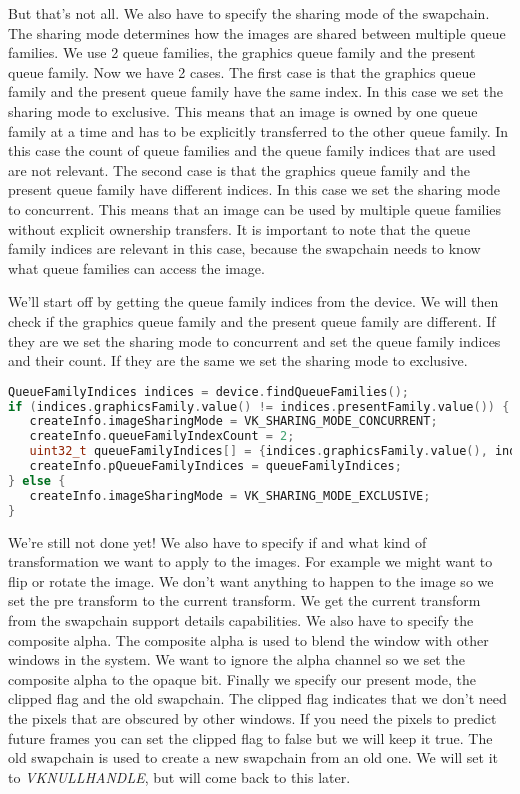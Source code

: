 \documentclass[12pt]{report} \usepackage{preamble}
\begin{document}
But that's not all. We also have to specify the sharing mode of the swapchain. The sharing mode
determines how the images are shared between multiple queue families. We use 2 queue families, the
graphics queue family and the present queue family. Now we have 2 cases. The first case is that the
graphics queue family and the present queue family have the same index. In this case we set the sharing
mode to exclusive. This means that an image is owned by one queue family at a time and has to be
explicitly transferred to the other queue family. In this case the count of queue families and the
queue family indices that are used are not relevant. The second case is that the graphics queue family
and the present queue family have different indices. In this case we set the sharing mode to concurrent.
This means that an image can be used by multiple queue families without explicit ownership transfers.
It is important to note that the queue family indices are relevant in this case, because the swapchain needs
to know what queue families can access the image.

We'll start off by getting the queue family indices from the device. We will then check if the graphics
queue family and the present queue family are different. If they are we set the sharing mode to concurrent
and set the queue family indices and their count. If they are the same we set the sharing mode to exclusive.

\begin{lstlisting}[language=C++]
QueueFamilyIndices indices = device.findQueueFamilies();
if (indices.graphicsFamily.value() != indices.presentFamily.value()) {
   createInfo.imageSharingMode = VK_SHARING_MODE_CONCURRENT;
   createInfo.queueFamilyIndexCount = 2;
   uint32_t queueFamilyIndices[] = {indices.graphicsFamily.value(), indices.presentFamily.value()};
   createInfo.pQueueFamilyIndices = queueFamilyIndices;
} else {
   createInfo.imageSharingMode = VK_SHARING_MODE_EXCLUSIVE;
}
\end{lstlisting}

We're still not done yet! We also have to specify if and what kind of transformation we want
to apply to the images. For example we might want to flip or rotate the image. We don't want
anything to happen to the image so we set the pre transform to the current transform. We get
the current transform from the swapchain support details capabilities. We also have to specify
the composite alpha. The composite alpha is used to blend the window with other windows in the
system. We want to ignore the alpha channel so we set the composite alpha to the opaque bit.
Finally we specify our present mode, the clipped flag and the old swapchain. The clipped flag
indicates that we don't need the pixels that are obscured by other windows. If you need the
pixels to predict future frames you can set the clipped flag to false but we will keep it true.
The old swapchain is used to create a new swapchain from an old one. We will set it to
\textit{VK\textunderscore NULL\textunderscore HANDLE}, but will come back to this later.
\end{document}
